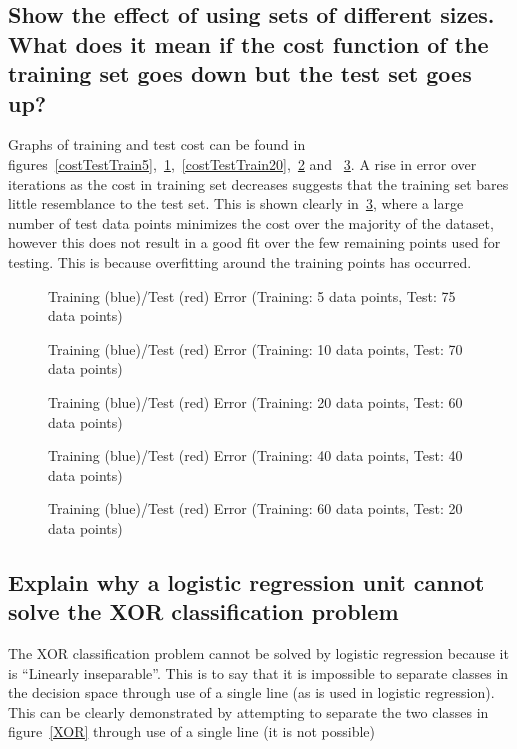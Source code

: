 \documentclass[titlepage]{scrartcl}
\begin{document}
\subsection{Show the effect of using sets of different sizes. What does it mean
if the cost function of the training set goes down but the test set goes up?}
Graphs of training and test cost can be found in
figures~\ref{costTestTrain5},~\ref{costTestTrain10},~\ref{costTestTrain20},~\ref{costTestTrain40}
and ~\ref{costTestTrain60}.
A rise in error over iterations as the cost in training set decreases suggests
that the training set bares little resemblance to the test set. This is shown
clearly in~\ref{costTestTrain60}, where a large number of test data points
minimizes the cost over the majority of the dataset, however this does not
result in a good fit over the few remaining points used for testing. This is
because overfitting around the training points has occurred.


\begin{figure}
    \caption{Training (blue)/Test (red) Error (Training: 5 data points, Test:
    75 data points)}
    \label{costTestTrain5}
    \caption{Training (blue)/Test (red) Error (Training: 10 data points, Test:
    70 data points)}
    \label{costTestTrain10}
\end{figure}
\begin{figure}
    \caption{Training (blue)/Test (red) Error (Training: 20 data points, Test:
    60 data points)}
    \label{costTestTrain20}
    \caption{Training (blue)/Test (red) Error (Training: 40 data points, Test:
    40 data points)}
    \label{costTestTrain40}
\end{figure}
\begin{figure}
    \caption{Training (blue)/Test (red) Error (Training: 60 data points, Test:
    20 data points)}
    \label{costTestTrain60}
\end{figure}

\subsection{Explain why a logistic regression unit cannot solve the XOR
classification problem}
The XOR classification problem cannot be solved by logistic regression because
it is ``Linearly inseparable''. This is to say that it is impossible to
separate classes in the decision space through use of a single line (as is used
in logistic regression). This can be clearly demonstrated by attempting to
separate the two classes in figure~\ref{XOR} through use of a single line (it is not
possible)
\end{document}
